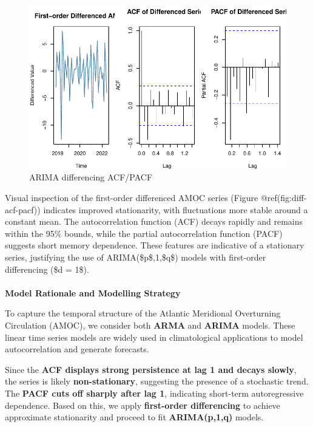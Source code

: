 \documentclass[
  11pt,
]{article}
\makeatletter
\let\oldparagraph\paragraph
\renewcommand{\paragraph}{
    \@ifstar
      \xxxParagraphStar
      \xxxParagraphNoStar
  }
\newcommand{\xxxParagraphStar}[1]{\oldparagraph*{#1}\mbox{}}
\newcommand{\xxxParagraphNoStar}[1]{\oldparagraph{#1}\mbox{}}
\makeatother
\begin{document}
\begin{figure}[H]

{\centering \includegraphics{project_files/figure-pdf/fig-diff-acf-pacf-1.pdf}

}

\caption{ARIMA differencing ACF/PACF}

\end{figure}%

Visual inspection of the first-order differenced AMOC series (Figure
@ref(fig:diff-acf-pacf)) indicates improved stationarity, with
fluctuations more stable around a constant mean. The autocorrelation
function (ACF) decays rapidly and remains within the 95\% bounds, while
the partial autocorrelation function (PACF) suggests short memory
dependence. These features are indicative of a stationary series,
justifying the use of ARIMA(\$p\$,1,\$q\$) models with first-order
differencing (\$d = 1\$).

\paragraph{\texorpdfstring{\textbf{Model Rationale and Modelling
Strategy}}{Model Rationale and Modelling Strategy}}\label{model-rationale-and-modelling-strategy}

To capture the temporal structure of the Atlantic Meridional Overturning
Circulation (AMOC), we consider both \textbf{ARMA} and \textbf{ARIMA}
models. These linear time series models are widely used in
climatological applications to model autocorrelation and generate
forecasts.

Since the \textbf{ACF displays strong persistence at lag 1 and decays
slowly}, the series is likely \textbf{non-stationary}, suggesting the
presence of a stochastic trend. The \textbf{PACF cuts off sharply after
lag 1}, indicating short-term autoregressive dependence. Based on this,
we apply \textbf{first-order differencing} to achieve approximate
stationarity and proceed to fit \textbf{ARIMA(p,1,q)} models.
\end{document}

